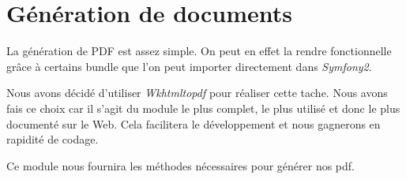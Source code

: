\section{Génération de documents}
La génération de PDF est assez simple. On peut en effet la rendre fonctionnelle grâce à certains bundle que l'on peut importer directement dans \textit{Symfony2}.

Nous avons décidé d'utiliser \textit{Wkhtmltopdf} pour réaliser cette tache.
Nous avons fais ce choix car il s'agit du module le plus complet, le plus utilisé et donc le plus documenté sur le Web. Cela facilitera le développement et nous gagnerons en rapidité de codage.

Ce module nous fournira les méthodes nécessaires pour générer nos pdf.